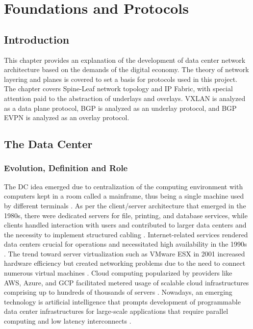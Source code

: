 \chapter{Foundations and Protocols}
\section{Introduction}
This chapter provides an explanation of the development of data center network architecture based on the demands of the digital economy. The theory of network layering and planes is covered to set a basis for protocols used in this project. The chapter covers Spine-Leaf network topology and IP Fabric, with special attention paid to the abstraction of underlays and overlays. VXLAN is analyzed as a data plane protocol, BGP is analyzed as an underlay protocol, and BGP EVPN is analyzed as an overlay protocol.

\section{The Data Center}
\subsection{Evolution, Definition and Role}
The DC idea emerged due to centralization of the computing environment with computers kept in a room called a mainframe, thus being a single machine used by different terminals \cite{IBM_mainframe}. As per the client/server architecture that emerged in the 1980s, there were dedicated servers for file, printing, and database services, while clients handled interaction with users and contributed to larger data centers and the necessity to implement structured cabling \cite{IEEE_Evolution_of_Client_Server}. Internet-related services rendered data centers crucial for operations and necessitated high availability in the 1990s \cite{CERN_Data_Centre_Historical_Documentation}. The trend toward server virtualization such as VMware ESX in 2001 increased hardware efficiency but created networking problems due to the need to connect numerous virtual machines \cite{VMware_ESX}. Cloud computing popularized by providers like AWS, Azure, and GCP facilitated metered usage of scalable cloud infrastructures comprising up to hundreds of thousands of servers \cite{AWS_History_of_CC}. Nowadays, an emerging technology is artificial intelligence that prompts development of programmable data center infrastructures for large-scale applications that require parallel computing and low latency interconnects \cite{NVIDIA_AI_Inference_Whitepaper}.


